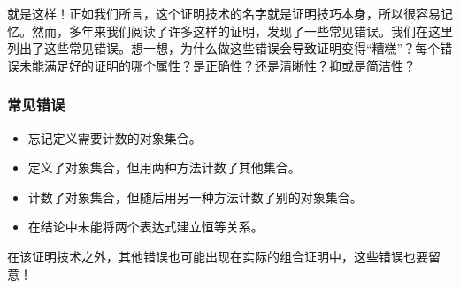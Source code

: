 就是这样！正如我们所言，这个证明技术的名字就是证明技巧本身，所以很容易记忆。然而，多年来我们阅读了许多这样的证明，发现了一些常见错误。我们在这里列出了这些常见错误。想一想，为什么做这些错误会导致证明变得``糟糕''？每个错误未能满足好的证明的哪个属性？是正确性？还是清晰性？抑或是简洁性？

\subsubsection*{常见错误}

\begin{itemize}
    \item 忘记定义需要计数的对象集合。
    \item 定义了对象集合，但用两种方法计数了其他集合。
    \item 计数了对象集合，但随后用另一种方法计数了别的对象集合。
    \item 在结论中未能将两个表达式建立恒等关系。
\end{itemize}
在该证明技术之外，其他错误也可能出现在实际的组合证明中，这些错误也要留意！
